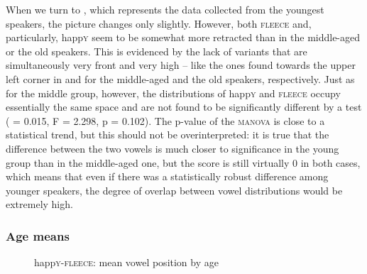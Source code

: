 When we turn to , which represents the data collected from the youngest speakers, the picture changes only slightly.
However, both \textsc{fleece} and, particularly, happ\textsc{y} seem to be somewhat more retracted than in the middle-aged or the old speakers.
This is evidenced by the lack of variants that are simultaneously very front and very high -- like the ones found towards the upper left corner in  and  for the middle-aged and the old speakers, respectively.
Just as for the middle group, however, the distributions of happ\textsc{y} and \textsc{fleece} occupy essentially the same space and are not found to be significantly different by a  test ( = 0.015, F = 2.298, p = 0.102).
The p-value of the \textsc{manova} is close to a statistical trend, but this should not be overinterpreted: it is true that the difference between the two vowels is much closer to significance in the young group than in the middle-aged one, but the  score is still virtually 0 in both cases, which means that even if there was a statistically robust difference among younger speakers, the degree of overlap between vowel distributions would be extremely high.

\subsubsection{Age means}

\begin{figure}[b]
	
	
	\caption{happ\textsc{y}-\textsc{fleece}: mean vowel position by age}
	\label{fig.happy.space.means}
\end{figure}

